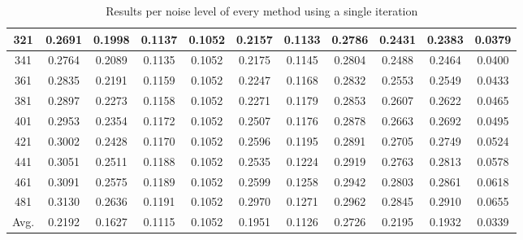 \begin{table}[ht!]
\begin{tabular}{c|c|c|c|c|c|c|c|c|c|c}
321 & 0.2691 & 0.1998 & 0.1137 & 0.1052 & 0.2157 & 0.1133 & 0.2786 & 0.2431 & 0.2383 & 0.0379 \\ \hline
341 & 0.2764 & 0.2089 & 0.1135 & 0.1052 & 0.2175 & 0.1145 & 0.2804 & 0.2488 & 0.2464 & 0.0400 \\ \hline
361 & 0.2835 & 0.2191 & 0.1159 & 0.1052 & 0.2247 & 0.1168 & 0.2832 & 0.2553 & 0.2549 & 0.0433 \\ \hline
381 & 0.2897 & 0.2273 & 0.1158 & 0.1052 & 0.2271 & 0.1179 & 0.2853 & 0.2607 & 0.2622 & 0.0465 \\ \hline
401 & 0.2953 & 0.2354 & 0.1172 & 0.1052 & 0.2507 & 0.1176 & 0.2878 & 0.2663 & 0.2692 & 0.0495 \\ \hline
421 & 0.3002 & 0.2428 & 0.1170 & 0.1052 & 0.2596 & 0.1195 & 0.2891 & 0.2705 & 0.2749 & 0.0524 \\ \hline
441 & 0.3051 & 0.2511 & 0.1188 & 0.1052 & 0.2535 & 0.1224 & 0.2919 & 0.2763 & 0.2813 & 0.0578 \\ \hline
461 & 0.3091 & 0.2575 & 0.1189 & 0.1052 & 0.2599 & 0.1258 & 0.2942 & 0.2803 & 0.2861 & 0.0618 \\ \hline
481 & 0.3130 & 0.2636 & 0.1191 & 0.1052 & 0.2970 & 0.1271 & 0.2962 & 0.2845 & 0.2910 & 0.0655 \\ \hline
Avg.  & 0.2192 & 0.1627 & 0.1115 & 0.1052 & 0.1951 & 0.1126 & 0.2726 & 0.2195 & 0.1932 & 0.0339 \\ \hline
\end{tabular}
\caption{Results per noise level of every method using a single iteration}
\label{tab:1itperNoise}
\end{table}


